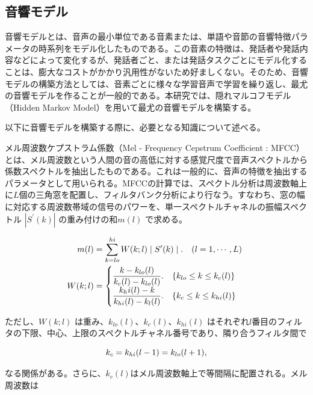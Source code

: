 \subsection{音響モデル}
\label{acoustic_model}
音響モデルとは、音声の最小単位である音素または、単語や音節の音響特徴パラメータの時系列をモデル化したものである。この音素の特徴は、発話者や発話内容などによって変化するが、発話者ごと、または発話タスクごとにモデル化することは、膨大なコストがかかり汎用性がないため好ましくない。そのため、音響モデルの構築方法としては、音素ごとに様々な学習音声で学習を繰り返し、最尤の音響モデルを作ることが一般的である。本研究では、隠れマルコフモデル（Hidden Markov Model）を用いて最尤の音響モデルを構築する。\par
以下に音響モデルを構築する際に、必要となる知識について述べる。\vspace{0.2in}

\par
メル周波数ケプストラム係数（Mel - Frequency Cepstrum Coefficient : MFCC）とは、メル周波数という人間の音の高低に対する感覚尺度で音声スペクトルから係数スペクトルを抽出したものである\cite{sp_recognition_shikano}。これは一般的に、音声の特徴を抽出するパラメータとして用いられる。MFCCの計算では、スペクトル分析は周波数軸上に$L$個の三角窓を配置し、フィルタバンク分析により行なう。すなわち、窓の幅に対応する周波数帯域の信号のパワーを、単一スペクトルチャネルの振幅スペクトル $|S^\prime (k)|$ の重み付けの和$m(l)$ で求める。

\begin{align}
m(l) &=\sum_{k=lo}^{hi}W(k;l)\mid S^\prime(k)\mid. \quad (l=1,\cdots,L) \notag \\
W(k;l) &=\begin{cases}\displaystyle\frac{k-k_{lo}(l)}{k_c(l)-k_{lo}(l)}.\quad \{k_{lo}\leq k \leq k_c(l)\} \\ 
\displaystyle\frac{k_hi(l)-k}{k_{hi}(l)-k_{l}(l)}.\quad \{k_{c}\leq k \leq k_{hi}(l)\} \end{cases} \notag
\end{align}

ただし、$W(k;l)$ は重み、$k_{lo}(l)、k_c(l)、k_{hi}(l)$ はそれぞれ$l$番目のフィルタの下限、中心、上限のスペクトルチャネル番号であり、隣り合うフィルタ間で

\begin{equation}
k_c=k_{hi}(l-1)=k_{lo}(l+1), \notag
\end{equation}

なる関係がある。さらに、$k_c(l)$はメル周波数軸上で等間隔に配置される。メル周波数は

